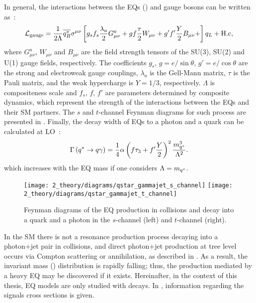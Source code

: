 In general, the interactions between the \acp{EQ} (\qstar) and gauge bosons can be written as~\cite{Zhan_Li_Liu_Li-2016}:
\begin{equation}
    \mathcal{L}_{\text{gauge}} = 
    \frac{1}{2\Lambda}
    \overline{q^{*}_R}
    \sigma^{\mu\nu}
    \left[
        g_s f_s \frac{\lambda_a}{2} G_{\mu\nu}^a +
        g f \frac{\tau}{2} W_{\mu\nu} +
        g' f' \frac{Y}{2} B_{\mu\nu} +
    \right]
    q_L
    + \text{H.c},
\end{equation}
where \(G_{\mu\nu}^a\), \(W_{\mu\nu}\) and \(B_{\mu\nu}\) are the field strength tensors of the SU(3), SU(2) and U(1) gauge fields, respectively. The coefficients \(g_s\), \(g = e / \sin \theta\), \(g' = e / \cos \theta\) are the strong and electroweak gauge couplings, \(\lambda_a\) is the Gell-Mann matrix, \(\tau\) is the Pauli matrix, and the weak hypercharge is \(Y = 1/3\), respectively. \(\Lambda\) is compositeness scale and \(f_s, \, f, \, f'\) are parameters determined by composite dynamics, which represent the strength of the interactions between the \acp{EQ} and their \ac{SM} partners. The \(s\) and \(t\)-channel Feynman diagrams for such process are presented in \Fig{\ref{fig:theory:bsm:diagrams}}. Finally, the decay width of \acp{EQ} to a photon and a quark can be calculated at \ac{LO}~\cite{Zhan_Li_Liu_Li-2016}:
\begin{equation}
    \Gamma\left(q^{*} \rightarrow q \gamma\right) =
    \frac{1}{4}
    \alpha
    \left(f \tau_3 + f' \frac{Y}{2}\right)^2
    \frac{m_{q^*}^3}{\Lambda^2}.
\end{equation}
which increases with the \ac{EQ} mass \mq if one considers \(\Lambda = m_{q^*}\).


\begin{figure}[ht!]
    \centering
    \texttt{[image: 2\_theory/diagrams/qstar\_gammajet\_s\_channel]}
    \hspace{1cm}
    \texttt{[image: 2\_theory/diagrams/qstar\_gammajet\_t\_channel]}
    \caption{Feynman diagrams of the \ac{EQ} production in \pp collisions and decay into a quark and a photon in the \(s\)-channel (left) and \(t\)-channel (right).}
    \label{fig:theory:bsm:diagrams}
\end{figure}


In the \ac{SM} there is not a resonance production process decaying into a photon+jet pair in \pp collisions, and direct photon+jet production at tree level occurs via Compton scattering or \qqbar annihilation, as described in \Sect{\ref{subsec:theory:sm:prompt_photon}}. As a result, the \gammajet invariant mass (\myj) distribution is rapidly falling; thus, the \gammajet production mediated by a heavy \ac{EQ} may be discovered if it exists. Hereinafter, in the context of this thesis, \ac{EQ} models are only studied with \gammajet decays. In \Ch{\ref{ch:samples}}, information regarding the signals cross sections is given.

